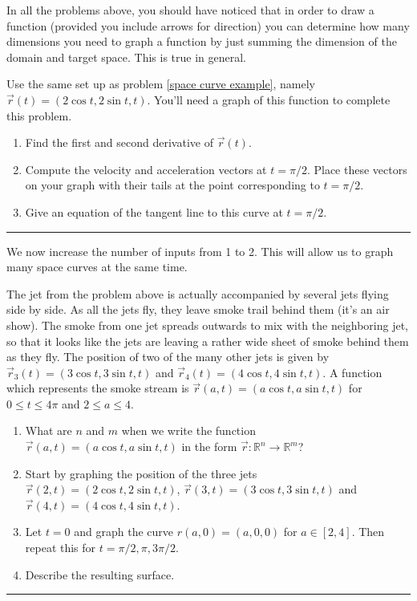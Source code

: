 In all the problems above, you should have noticed that in order to draw a function (provided you include arrows for direction) you can determine how many dimensions you need to graph a function by just summing the dimension of the domain and target space. This is true in general.

\begin{problem}
 Use the same set up as problem \ref{space curve example}, namely $\vec r(t)=(2\cos t, 2\sin t, t).$  You'll need a graph of this function to complete this problem.
 \begin{enumerate}
  \item Find the first and second derivative of $\vec r(t)$. 
  \item Compute the velocity and acceleration vectors at $t=\pi/2$. Place these vectors on your graph with their tails at the point corresponding to $t=\pi/2$.
  \item Give an equation of the tangent line to this curve at $t=\pi/2$.
 \end{enumerate}
\hrule\end{problem}


We now increase the number of inputs from 1 to 2.  This will allow us to graph many space curves at the same time.

\begin{problem} \label{parametric surface example}%
%
 The jet from the problem above is actually accompanied by several jets flying side by side. As all the jets fly, they leave smoke trail behind them (it's an air show). The smoke from one jet spreads outwards to mix with the neighboring jet, so that it looks like the jets are leaving a rather wide sheet of smoke behind them as they fly. The position of two of the many other jets is given by $\vec r_3(t)=(3\cos t, 3\sin t, t)$ and $\vec r_4(t)=(4\cos t,4\sin t,t)$.  A function which represents the smoke stream is $\vec r(a,t)=(a\cos t, a\sin t, t)$ for $0\leq t\leq 4\pi$ and $2\leq a\leq 4$.
 \begin{enumerate}
  \item What are $n$ and $m$ when we write the function $\vec r(a,t)=(a\cos t, a\sin t, t)$ in the form  $\vec r:{\mathbb{R}}^n\to {\mathbb{R}}^m$?
  \item Start by graphing the position of the three jets $\vec r(2,t)=(2\cos t, 2\sin t, t)$, $\vec r(3,t)=(3\cos t, 3\sin t, t)$ and $\vec r(4,t)=(4\cos t,4\sin t,t)$.  
  \item Let $t=0$ and graph the curve $r(a,0)=(a,0,0)$ for $a\in[2,4]$.  Then repeat this for $t=\pi/2,\pi,3\pi/2$.
  \item Describe the resulting surface.
 \end{enumerate}
\hrule\end{problem}

